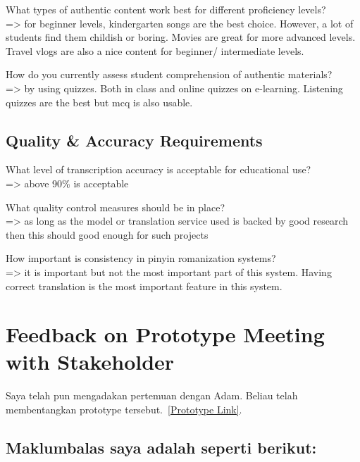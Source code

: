 \documentclass[oneside]{utmthesis}
\begin{document}
\noindent What types of authentic content work best for different proficiency levels?\\
=\textgreater{} for beginner levels, kindergarten songs are the best choice. However, a lot of students find them childish or boring. Movies are great for more advanced levels. Travel vlogs are also a nice content for beginner/ intermediate levels.

\noindent How do you currently assess student comprehension of authentic materials?\\ =\textgreater{} by using quizzes. Both in class and online quizzes on e-learning. Listening quizzes are the best but mcq is also usable.

\section{Quality \& Accuracy Requirements}
\noindent What level of transcription accuracy is acceptable for educational use?\\
=\textgreater{} above 90\% is acceptable

\noindent What quality control measures should be in place?\\
=\textgreater{} as long as the model or translation service used is backed by good research then this should good enough for such projects

\noindent How important is consistency in pinyin romanization systems?\\
=\textgreater{} it is important but not the most important part of this system. Having correct translation is the most important feature in this system.

\chapter{Feedback on Prototype Meeting with Stakeholder}\label{app:feedback-on-prototype}

Saya telah pun mengadakan pertemuan dengan Adam. Beliau telah membentangkan prototype tersebut.~\href{https://lexiflow.amerai.top}{[Prototype Link]}.

\section{Maklumbalas saya adalah seperti berikut:}
\end{document}

